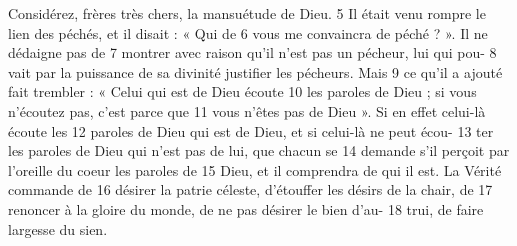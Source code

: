 Considérez, frères très chers, la mansuétude de Dieu.	 
5	 	Il était venu rompre le lien des péchés, et il disait : « Qui de	 
6	 	vous me convaincra de péché ? ». Il ne dédaigne pas de	 
7	 	montrer avec raison qu'il n'est pas un pécheur, lui qui pou-	 
8	 	vait par la puissance de sa divinité justifier les pécheurs. Mais	 
9	 	ce qu'il a ajouté fait trembler : « Celui qui est de Dieu écoute	 
10	 	les paroles de Dieu ; si vous n'écoutez pas, c'est parce que	 
11	 	vous n'êtes pas de Dieu ». Si en effet celui-là écoute les	 
12	 	paroles de Dieu qui est de Dieu, et si celui-là ne peut écou-	 
13	 	ter les paroles de Dieu qui n'est pas de lui, que chacun se	 
14	 	demande s'il perçoit par l'oreille du coeur les paroles de	 
15	 	Dieu, et il comprendra de qui il est. La Vérité commande de	 
16	 	désirer la patrie céleste, d'étouffer les désirs de la chair, de	 
17	 	renoncer à la gloire du monde, de ne pas désirer le bien d'au-	 
18	 	trui, de faire largesse du sien.